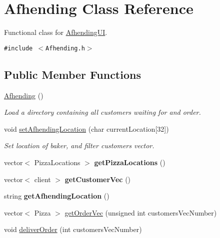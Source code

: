 \hypertarget{class_afhending}{
\section{Afhending Class Reference}
\label{class_afhending}
}
Functional class for \hyperlink{class_afhending_u_i}{Afhending\-UI}.  


{\tt \#include $<$Afhending.h$>$}

\subsection*{Public Member Functions}
\begin{CompactItemize}
\item 
\hypertarget{class_afhending_9365433a6f973ad929ffc0b458bc7c6f}{
\hyperlink{class_afhending_9365433a6f973ad929ffc0b458bc7c6f}{Afhending} ()}
\label{class_afhending_9365433a6f973ad929ffc0b458bc7c6f}

\begin{CompactList}\small\item\em Load a directory containing all customers waiting for and order. \item\end{CompactList}\item 
void \hyperlink{class_afhending_411cc45b50d4a59a33d76f6c54e52f78}{set\-Afhending\-Location} (char current\-Location\mbox{[}32\mbox{]})
\begin{CompactList}\small\item\em Set location of baker, and filter customers vector. \item\end{CompactList}\item 
\hypertarget{class_afhending_3d38e7498fba59674c7d3838bf4c1824}{
vector$<$ Pizza\-Locations $>$ {\bf get\-Pizza\-Locations} ()}
\label{class_afhending_3d38e7498fba59674c7d3838bf4c1824}

\item 
\hypertarget{class_afhending_3970b0afe27b514282442b11592e1602}{
vector$<$ client $>$ {\bf get\-Customer\-Vec} ()}
\label{class_afhending_3970b0afe27b514282442b11592e1602}

\item 
\hypertarget{class_afhending_543bc751e47e95a5382a13e161387a1b}{
string {\bf get\-Afhending\-Location} ()}
\label{class_afhending_543bc751e47e95a5382a13e161387a1b}

\item 
vector$<$ Pizza $>$ \hyperlink{class_afhending_ad0cbeddec394b25c5eade57247f4110}{get\-Order\-Vec} (unsigned int customers\-Vec\-Number)
\item 
void \hyperlink{class_afhending_b3cb078e2502d2eb7e6e67623cbe30b9}{deliver\-Order} (int customers\-Vec\-Number)
\end{CompactItemize}
